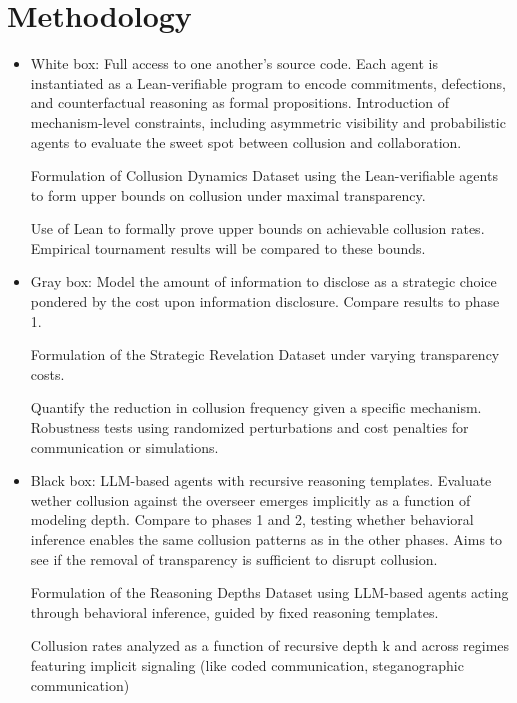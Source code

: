 \documentclass{article}
\begin{document}
\section{Methodology}
\begin{itemize}
    \item White box: Full access to one another's source code. Each agent is instantiated as a Lean-verifiable program to encode commitments, defections, and counterfactual reasoning as formal propositions.
    Introduction of mechanism-level constraints, including asymmetric visibility and probabilistic agents to evaluate the sweet spot between collusion and collaboration.
    
    Formulation of Collusion Dynamics Dataset using the Lean-verifiable agents to form upper bounds on collusion under maximal transparency.

    Use of Lean to formally prove upper bounds on achievable collusion rates. Empirical tournament results will be compared to these bounds.
    \item Gray box: Model the amount of information to disclose as a strategic choice pondered by the cost upon information disclosure. Compare results to phase 1.
    
    Formulation of the Strategic Revelation Dataset under varying transparency costs.

    Quantify the reduction in collusion frequency given a specific mechanism. Robustness tests using randomized perturbations and cost penalties for communication or simulations.
    \item Black box: LLM-based agents with recursive reasoning templates. Evaluate wether collusion against the overseer emerges implicitly as a function of modeling depth. Compare to phases 1 and 2, testing whether behavioral inference enables the same collusion patterns as in the other phases. Aims to see if the removal of transparency is sufficient to disrupt collusion.
    
    Formulation of the Reasoning Depths Dataset using LLM-based agents acting through behavioral inference, guided by fixed reasoning templates.

    Collusion rates analyzed as a function of recursive depth k and across regimes featuring implicit signaling (like coded communication, steganographic communication)
\end{itemize}
\end{document}
